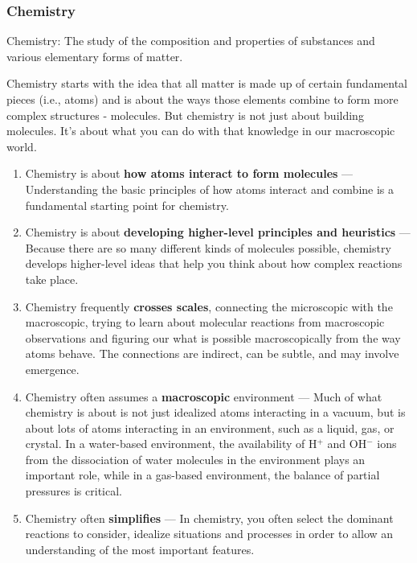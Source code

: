 \subsubsection{Chemistry}
Chemistry: The study of the composition and properties of substances and various elementary forms of matter.

Chemistry starts with the idea that all matter is made up of certain fundamental pieces (i.e., atoms) and is about the ways those elements combine to form more complex structures - molecules. But chemistry is not just about building molecules. It's about what you can do with that knowledge in our macroscopic world.

\begin{enumerate}
\item Chemistry is about {\bf how atoms interact to form molecules} --- Understanding the basic principles of how atoms interact and combine is a fundamental starting point for chemistry.

\item Chemistry is about {\bf developing higher-level principles and heuristics} --- Because there are so many different kinds of molecules possible, chemistry develops higher-level ideas that help you think about how complex reactions take place.

\item Chemistry frequently {\bf crosses scales}, connecting the microscopic with the macroscopic, trying to learn about molecular reactions from macroscopic observations and figuring our what is possible macroscopically from the way atoms behave. The connections are indirect, can be subtle, and may involve emergence.

\item Chemistry often assumes a {\bf macroscopic} environment --- Much of what chemistry is about is not just idealized atoms interacting in a vacuum, but is about lots of atoms interacting in an environment, such as a liquid, gas, or crystal. In a water-based environment, the availability of H$^+$ and OH$^-$ ions from the dissociation of water molecules in the environment plays an important role, while in a gas-based environment, the balance of partial pressures is critical.

\item Chemistry often {\bf simplifies} --- In chemistry, you often select the dominant reactions to consider, idealize situations and processes in order to allow an understanding of the most important features.

\end{enumerate}

